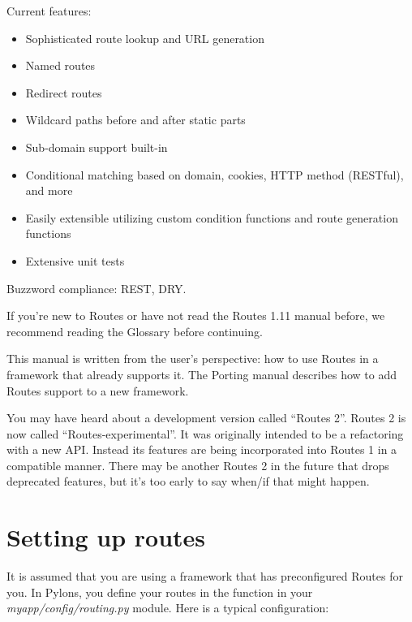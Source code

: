 \documentclass[letterpaper,10pt,english]{manual}
\begin{document}
Current features:
\begin{itemize}
\item {} 
Sophisticated route lookup and URL generation

\item {} 
Named routes

\item {} 
Redirect routes

\item {} 
Wildcard paths before and after static parts

\item {} 
Sub-domain support built-in

\item {} 
Conditional matching based on domain, cookies, HTTP method (RESTful), and more

\item {} 
Easily extensible utilizing custom condition functions and route generation
functions

\item {} 
Extensive unit tests

\end{itemize}

Buzzword compliance:  REST, DRY.

If you're new to Routes or have not read the Routes 1.11 manual before, we
recommend reading the Glossary before continuing.

This manual is written from the user's perspective: how to use Routes in a
framework that already supports it. The Porting
manual describes how to add Routes support to a new framework.

You may have heard about a development version called ``Routes 2''.  Routes 2 is
now called ``Routes-experimental''.  It was originally intended to be a
refactoring with a new API.  Instead its features are being incorporated into
Routes 1 in a compatible manner.  There may be another Routes 2 in the future
that drops deprecated features, but it's too early to say when/if that might
happen.


\section{Setting up routes}

It is assumed that you are using a framework that has preconfigured Routes for
you.  In Pylons, you define your routes in the  function in your
\emph{myapp/config/routing.py} module.  Here is a typical configuration:
\end{document}
